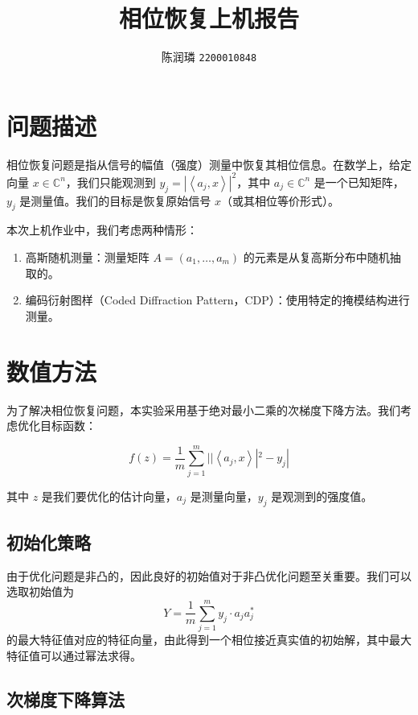 \documentclass{article}
\title{相位恢复上机报告}
\author{陈润璘 \texttt{2200010848}}
\begin{document}
\maketitle

\section{问题描述}

相位恢复问题是指从信号的幅值（强度）测量中恢复其相位信息。在数学上，给定向量 $x \in \mathbb{C}^n$，我们只能观测到
$y_j = |\left<a_j, x\right>|^2$，其中 $a_j \in \mathbb{C}^{n}$
是一个已知矩阵，$y_j$ 是测量值。我们的目标是恢复原始信号 $x$（或其相位等价形式）。

本次上机作业中，我们考虑两种情形：
\begin{enumerate}
    \item 高斯随机测量：测量矩阵 $A = (a_1, \dots , a_m)$ 的元素是从复高斯分布中随机抽取的。
    \item 编码衍射图样（Coded Diffraction Pattern，CDP）：使用特定的掩模结构进行测量。
\end{enumerate}

\section{数值方法}

为了解决相位恢复问题，本实验采用基于绝对最小二乘的次梯度下降方法。我们考虑优化目标函数：

\begin{equation}
    f(z) = \frac{1}{m}\sum_{j=1}^{m}||\left<a_j, x\right>|^2 - y_j|
\end{equation}

其中 $z$ 是我们要优化的估计向量，$a_j$ 是测量向量，$y_j$ 是观测到的强度值。

\subsection{初始化策略}

由于优化问题是非凸的，因此良好的初始值对于非凸优化问题至关重要。我们可以选取初始值为
\begin{equation}
    Y = \frac{1}{m}\sum_{j=1}^{m} y_j \cdot a_j a_j^*
\end{equation}
的最大特征值对应的特征向量，由此得到一个相位接近真实值的初始解，其中最大特征值可以通过幂法求得。

\subsection{次梯度下降算法}
\end{document}
